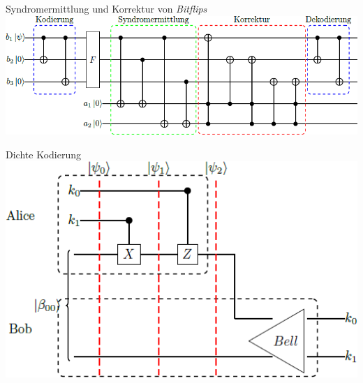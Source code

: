 \documentclass[fleqn,compress,utf8,aspectratio=169,t]{beamer}
\begin{document}
\begin{frame}{Syndromermittlung und Korrektur von \textit{Bitflips}}
\includegraphics[width=\textwidth]{images/3d-syndrom-ermittlung.png}
\end{frame}
\begin{frame}{Dichte Kodierung}
\includegraphics[height=.8\textheight]{images/3d-dichte-kodierung.png}
\end{frame}
\end{document}
